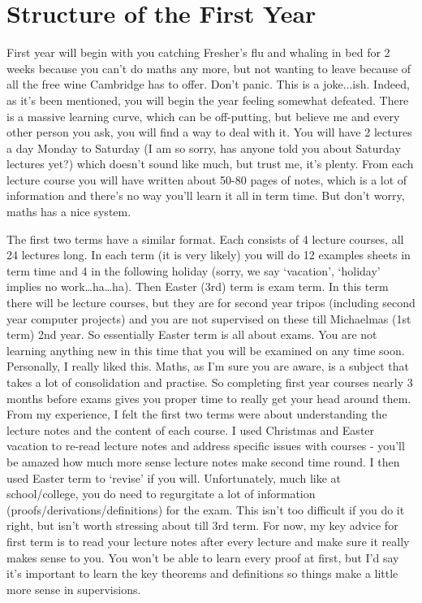 \documentclass[a4paper,11pt]{article}
\begin{document}
\section{Structure of the First Year}

First year will begin with you catching Fresher's flu and whaling in bed for 2 weeks because you can't do maths any more, but not wanting to leave because of all the free wine Cambridge has to offer. Don't panic. This is a joke...ish. Indeed, as it's been mentioned, you will begin the year feeling somewhat defeated. There is a massive learning curve, which can be off-putting, but believe me and every other person you ask, you will find a way to deal with it. You will have 2 lectures a day Monday to Saturday (I am so sorry, has anyone told you about Saturday lectures yet?) which doesn't sound like much, but trust me, it's plenty. From each lecture course you will have written about 50-80 pages of notes, which is a lot of information and there's no way you'll learn it all in term time. But don't worry, maths has a nice system.

The first two terms have a similar format. Each consists of 4 lecture courses, all 24 lectures long. In each term (it is very likely) you will do 12 examples sheets in term time and 4 in the following holiday (sorry, we say `vacation', `holiday' implies no work\dots  ha\dots ha). Then Easter (3rd) term is exam term. In this term there will be lecture courses, but they are for second year tripos (including second year computer projects) and you are not supervised on these till Michaelmas (1st term) 2nd year. So essentially Easter term is all about exams. You are not learning anything new in this time that you will be examined on any time soon. Personally, I really liked this. Maths, as I'm sure you are aware, is a subject that takes a lot of consolidation and practise. So completing first year courses nearly 3 months before exams gives you proper time to really get your head around them. From my experience, I felt the first two terms were about understanding the lecture notes and the content of each course. I used Christmas and Easter vacation to re-read lecture notes and address specific issues with courses - you'll be amazed how much more sense lecture notes make second time round. I then used Easter term to `revise' if you will. Unfortunately, much like at school/college, you do need to regurgitate a lot of information (proofs/derivations/definitions) for the exam. This isn't too difficult if you do it right, but isn't worth stressing about till 3rd term. For now, my key advice for first term is to read your lecture notes after every lecture and make sure it really makes sense to you. You won't be able to learn every proof at first, but I'd say it's important to learn the key theorems and definitions so things make a little more sense in supervisions.
\end{document}
